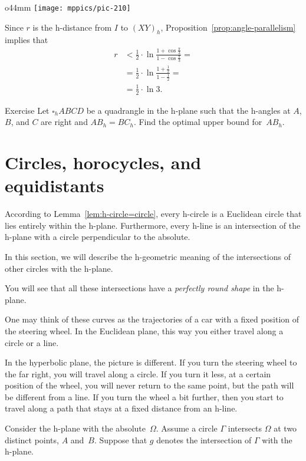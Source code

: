 {

\begin{wrapfigure}{o}{44mm}
\centering
\vskip-4mm
\texttt{[image: mppics/pic-210]}
\end{wrapfigure} 

Since $r$ is the h-distance from $I$ to $(XY)_h$,
Proposition~\ref{prop:angle-parallelism} implies that
\begin{align*}r&<\tfrac12\cdot\ln \tfrac{1+\cos\frac\pi3}{1-\cos\frac\pi3}=
\\
&=\tfrac12\cdot\ln\frac{1+\tfrac12}{1-\tfrac12}=
\\
&=\tfrac12\cdot\ln 3.
\end{align*}
\qedsf

}

\begin{thm}{Exercise}\label{ex:side-sup}
Let $\square_h ABCD$ be a quadrangle in the h-plane 
such that the h-angles at $A$, $B$, and $C$ are right and $AB_h=BC_h$.
Find the optimal upper bound for~$AB_h$.
\end{thm}


\section{Circles, horocycles, and equidistants}

According to Lemma~\ref{lem:h-circle=circle},
every h-circle is a Euclidean circle that lies entirely within the h-plane.
Furthermore, every h-line is an intersection of the h-plane with a circle
perpendicular to the absolute.

In this section, we will describe the 
h-geometric meaning of the intersections 
of other circles with the h-plane.

You will see that all these intersections have a {}\emph{perfectly round shape} in the h-plane.

One may think of these curves as the trajectories of a car with a fixed position of the steering wheel.
In the Euclidean plane, 
this way you either travel along a circle or a line.

In the hyperbolic plane, the picture is different.
If you turn the steering wheel to the far right, you will travel along a circle.
If you turn it less, at a certain position of the wheel, you will never return to the same point, but the path will be different from a line.
If you turn the wheel a bit further, then you start to travel along a path that stays at a fixed distance from an h-line.

Consider the h-plane with the absolute~$\Omega$.
Assume a circle $\Gamma$ intersects $\Omega$ at two distinct points, $A$ and~$B$. 
Suppose that $g$ denotes the intersection of $\Gamma$ with the h-plane.

